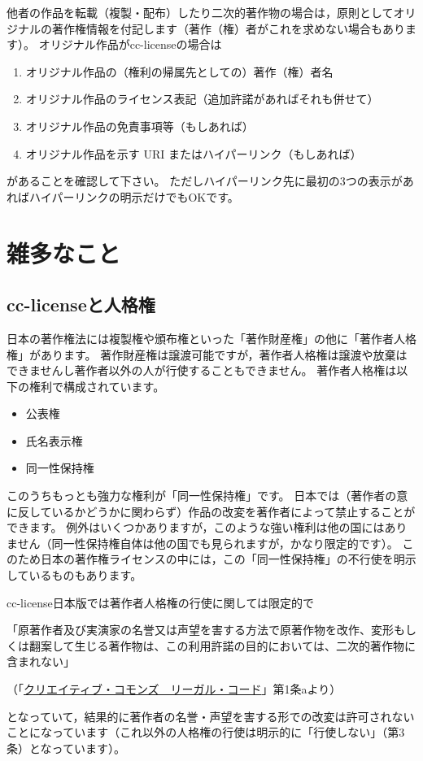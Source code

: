 \documentclass{ltjsarticle}
\begin{document}
他者の作品を転載（複製・配布）したり二次的著作物の場合は，原則としてオリジナルの著作権情報を付記します（著作（権）者がこれを求めない場合もあります）。
オリジナル作品がcc-licenseの場合は
\begin{enumerate}
\item オリジナル作品の（権利の帰属先としての）著作（権）者名
\item オリジナル作品のライセンス表記（追加許諾があればそれも併せて）
\item オリジナル作品の免責事項等（もしあれば）
\item オリジナル作品を示す URI またはハイパーリンク（もしあれば）
\end{enumerate}
があることを確認して下さい。
ただしハイパーリンク先に最初の3つの表示があればハイパーリンクの明示だけでもOKです。


\section{雑多なこと}

\subsection{cc-licenseと人格権}

日本の著作権法には複製権や頒布権といった「著作財産権」の他に「著作者人格権」があります。
著作財産権は譲渡可能ですが，著作者人格権は譲渡や放棄はできませんし著作者以外の人が行使することもできません。
著作者人格権は以下の権利で構成されています。
\begin{itemize}
\item 公表権
\item 氏名表示権
\item 同一性保持権
\end{itemize}
このうちもっとも強力な権利が「同一性保持権」です。
日本では（著作者の意に反しているかどうかに関わらず）作品の改変を著作者によって禁止することができます。
例外はいくつかありますが，このような強い権利は他の国にはありません（同一性保持権自体は他の国でも見られますが，かなり限定的です）。
このため日本の著作権ライセンスの中には，この「同一性保持権」の不行使を明示しているものもあります。

cc-license日本版では著作者人格権の行使に関しては限定的で
\begin{mdframed}
「原著作者及び実演家の名誉又は声望を害する方法で原著作物を改作、変形もしくは翻案して生じる著作物は、この利用許諾の目的においては、二次的著作物に含まれない」\par
（「\href{http://creativecommons.org/licenses/by-sa/2.1/jp/legalcode}{クリエイティブ・コモンズ　リーガル・コード}」第1条aより）
\end{mdframed}
となっていて，結果的に著作者の名誉・声望を害する形での改変は許可されないことになっています（これ以外の人格権の行使は明示的に「行使しない」（第3条）となっています）。
\end{document}
